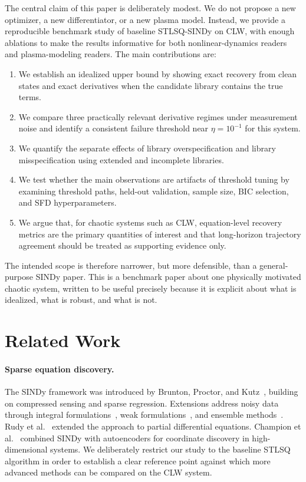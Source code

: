 \documentclass[12pt]{article}
\begin{document}
The central claim of this paper is deliberately modest.
We do not propose a new optimizer, a new differentiator, or a new plasma model.
Instead, we provide a reproducible benchmark study of baseline STLSQ-SINDy on CLW, with enough ablations to make the results informative for both nonlinear-dynamics readers and plasma-modeling readers.
The main contributions are:

\begin{enumerate}
\item We establish an idealized upper bound by showing exact recovery from clean states and exact derivatives when the candidate library contains the true terms.
\item We compare three practically relevant derivative regimes under measurement noise and identify a consistent failure threshold near $\eta = 10^{-1}$ for this system.
\item We quantify the separate effects of library overspecification and library misspecification using extended and incomplete libraries.
\item We test whether the main observations are artifacts of threshold tuning by examining threshold paths, held-out validation, sample size, BIC selection, and SFD hyperparameters.
\item We argue that, for chaotic systems such as CLW, equation-level recovery metrics are the primary quantities of interest and that long-horizon trajectory agreement should be treated as supporting evidence only.
\end{enumerate}

The intended scope is therefore narrower, but more defensible, than a general-purpose SINDy paper.
This is a benchmark paper about one physically motivated chaotic system, written to be useful precisely because it is explicit about what is idealized, what is robust, and what is not.


\section{Related Work}
\label{sec:related}

\paragraph{Sparse equation discovery.}
The SINDy framework was introduced by Brunton, Proctor, and Kutz~\cite{Brunton2016}, building on compressed sensing and sparse regression.
Extensions address noisy data through integral formulations~\cite{Schaeffer2017}, weak formulations~\cite{Messenger2021}, and ensemble methods~\cite{Fasel2022}.
Rudy et al.~\cite{Rudy2017} extended the approach to partial differential equations.
Champion et al.~\cite{Champion2019} combined SINDy with autoencoders for coordinate discovery in high-dimensional systems.
We deliberately restrict our study to the baseline STLSQ algorithm in order to establish a clear reference point against which more advanced methods can be compared on the CLW system.
\end{document}
